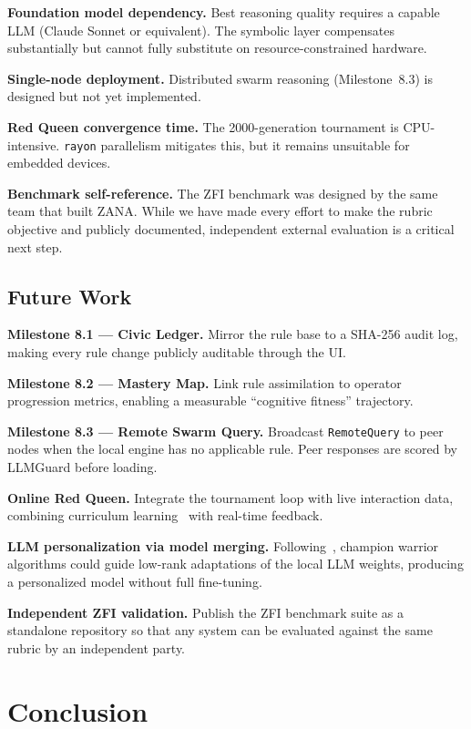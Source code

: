 \documentclass[12pt,a4paper]{article}
\begin{document}
\textbf{Foundation model dependency.} Best reasoning quality requires a capable LLM (Claude
Sonnet or equivalent). The symbolic layer compensates substantially but cannot fully substitute
on resource-constrained hardware.

\textbf{Single-node deployment.} Distributed swarm reasoning (Milestone~8.3) is designed
but not yet implemented.

\textbf{Red Queen convergence time.} The 2000-generation tournament is CPU-intensive.
\texttt{rayon} parallelism mitigates this, but it remains unsuitable for embedded devices.

\textbf{Benchmark self-reference.} The ZFI benchmark was designed by the same team that
built ZANA. While we have made every effort to make the rubric objective and publicly
documented, independent external evaluation is a critical next step.

\subsection{Future Work}
\label{sec:future}

\textbf{Milestone 8.1 --- Civic Ledger.} Mirror the rule base to a SHA-256 audit log,
making every rule change publicly auditable through the UI.

\textbf{Milestone 8.2 --- Mastery Map.} Link rule assimilation to operator progression
metrics, enabling a measurable ``cognitive fitness'' trajectory.

\textbf{Milestone 8.3 --- Remote Swarm Query.} Broadcast \texttt{RemoteQuery} to peer
nodes when the local engine has no applicable rule. Peer responses are scored by LLMGuard
before loading.

\textbf{Online Red Queen.} Integrate the tournament loop with live interaction data,
combining curriculum learning~\cite{bengio2009curriculum} with real-time feedback.

\textbf{LLM personalization via model merging.} Following~\cite{akiba2024modelmerging},
champion warrior algorithms could guide low-rank adaptations of the local LLM weights,
producing a personalized model without full fine-tuning.

\textbf{Independent ZFI validation.} Publish the ZFI benchmark suite as a standalone
repository so that any system can be evaluated against the same rubric by an independent
party.

\section{Conclusion}
\end{document}
